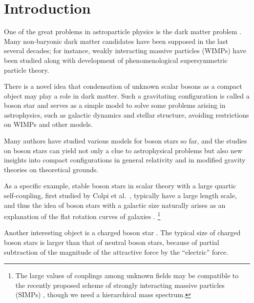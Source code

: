 \documentclass[
aps,prd,
12pt,%
nopreprintnumbers,
showpacs,
eqsecnum,
nofootinbib
]{revtex4-1}
\begin{document}
\section{Introduction}
\label{sec1}

One of the great problems in astroparticle physics
is the dark matter problem \cite{BHS,Profume}.
Many non-baryonic dark matter candidates have been supposed in the last several
decades; for instance, weakly interacting massive particles (WIMPs) have been
studied along with development of phenomenological supersymmetric particle theory.

There is a novel idea that condensation of unknown scalar bosons as a compact
object may play a role in dark matter.
Such a gravitating configuration is called a boson star \cite{Jetzer,LM,SM,LP} and
serves as a simple model to solve some problems arising in astrophysics, such as
galactic dynamics and stellar structure, avoiding restrictions on WIMPs and other
models.

Many authors have studied various models for boson stars so far,
and the studies on boson stars can yield
not only a clue to astrophysical problems but also
new insights into compact configurations in general relativity and in modified
gravity theories on theoretical grounds.

As a specific example, stable boson stars in scalar theory with a large
quartic self-coupling, first studied by Colpi et al.~\cite{colpi}, typically have a
large length scale, and thus the idea of boson stars with a galactic size naturally
arises as an explanation of the flat rotation curves of galaxies
\cite{LK,TCL,ST,ABBR,MA,BBAP,KS}.%
\footnote{The large values of couplings among unknown
fields may be compatible to the recently proposed scheme of strongly interacting
massive particles (SIMPs)
\cite{SIMP1,SIMP2}, though we need a hierarchical mass spectrum.}
 
Another interesting object is a charged boson star \cite{Jetzer,JB,JLS,DD,PQRR}.
The typical size of charged boson stars is larger than that of neutral boson
stars, because of partial subtraction of the magnitude of the attractive force
by the ``electric'' force.
\end{document}
